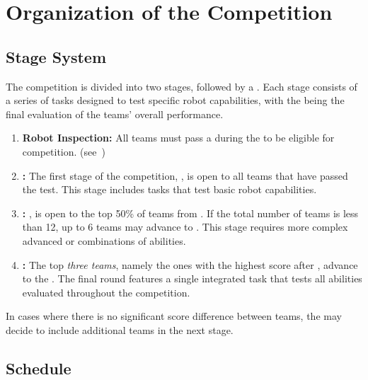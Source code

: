\section{Organization of the Competition}\label{sec:procedure_during_competition}

\subsection{Stage System}\label{rule:stages}

The competition is divided into two stages, followed by a \FINAL{}. Each stage consists of a series of tasks designed to test specific robot capabilities, with the \FINAL{} being the final evaluation of the teams' overall performance.

\begin{enumerate}
	\item \textbf{Robot Inspection:} 
	All teams must pass a \RobotInspection{} during the \SetupDays{} to be eligible for competition. (see~)

	\item \textbf{\SONE{}:} The first stage of the competition, \SONE{}, is open to all teams that have passed the \RobotInspection{} test. This stage includes tasks that test basic robot capabilities.

	\item \textbf{\STWO:} \STWO{}, is open to the top 50\% of teams from \SONE{}. If the total number of teams is less than 12, up to 6 teams may advance to \STWO{}.
	This stage requires more complex advanced or combinations of abilities.

	\item \textbf{\FINAL:} The top \emph{three teams}, namely the ones with the highest score after \STWO{}, advance to the \FINAL{}.
	The final round features a single integrated task that tests all abilities evaluated throughout the competition.

\end{enumerate}
In cases where there is no significant score difference between teams, the \TC{} may decide to include additional teams in the next stage.


\subsection{Schedule}\label{rule:schedule}

